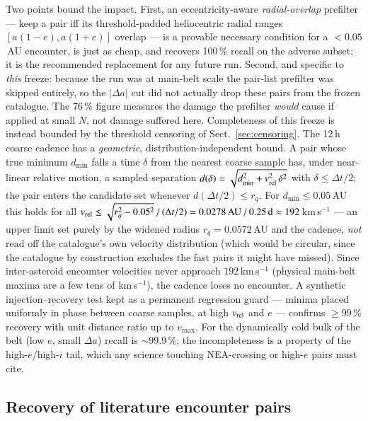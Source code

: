 \documentclass{aa}
\begin{document}
Two points bound the impact. First, an eccentricity-aware
\emph{radial-overlap} prefilter --- keep a pair iff its threshold-padded
heliocentric radial ranges $[a(1-e), a(1+e)]$ overlap --- is a provable
necessary condition for a $<0.05$\,AU encounter, is just as cheap, and recovers
100\,\% recall on the adverse subset; it is the recommended replacement for any
future run. Second, and specific to \emph{this} freeze: because the run was at
main-belt scale the pair-list prefilter was skipped entirely, so the
$|\Delta a|$ cut did not actually drop these pairs from the frozen catalogue.
The 76\,\% figure measures the damage the prefilter \emph{would} cause if
applied at small $N$, not damage suffered here. Completeness of this freeze is
instead bounded by the threshold censoring of Sect.~\ref{sec:censoring}. The
12\,h coarse cadence has a \emph{geometric}, distribution-independent bound. A
pair whose true minimum $d_{\min}$ falls a time $\delta$ from the nearest coarse
sample has, under near-linear relative motion, a sampled separation
$d(\delta) = \sqrt{d_{\min}^2 + v_{\rm rel}^2\,\delta^2}$ with $\delta \le
\Delta t/2$; the pair enters the candidate set whenever
$d(\Delta t/2) \le r_q$. For $d_{\min} \le 0.05$\,AU this holds for all
$v_{\rm rel} \le \sqrt{r_q^2 - 0.05^2}\,/\,(\Delta t/2) = 0.0278\,\mathrm{AU}\,/\,
0.25\,\mathrm{d} \approx 192$\,km\,s$^{-1}$ --- an upper limit set purely by the
widened radius $r_q = 0.0572$\,AU and the cadence, \emph{not} read off the
catalogue's own velocity distribution (which would be circular, since the
catalogue by construction excludes the fast pairs it might have missed). Since
inter-asteroid encounter velocities never approach $192$\,km\,s$^{-1}$ (physical
main-belt maxima are a few tens of km\,s$^{-1}$), the cadence loses no encounter.
A synthetic injection--recovery test kept as a permanent regression guard ---
minima placed uniformly in phase between coarse samples, at high $v_{\rm rel}$
and $e$ --- confirms $\ge99$\,\% recovery with unit distance ratio up to
$v_{\max}$. For the dynamically cold bulk of the belt (low $e$,
small $\Delta a$) recall is $\sim$99.9\,\%; the incompleteness is a property of
the high-$e$/high-$i$ tail, which any science touching NEA-crossing or high-$e$
pairs must cite.

\subsection{Recovery of literature encounter pairs}
\label{sec:litrecovery}
\end{document}

